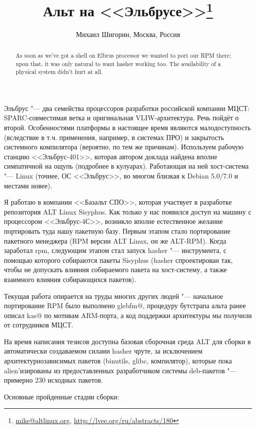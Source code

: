 \documentclass[10pt, a5paper]{article}
\begin{document}
\title{Альт на <<Эльбрусе>>\footnote{\url{mike@altlinux.org}, \url{http://lvee.org/ru/abstracts/180}}}
\author{Михаил Шигорин, Москва, Россия}
\maketitle
\begin{abstract}
As soon as we've got a shell on Elbrus processor we wanted to port our RPM there; upon that, it was only natural to want hasher working too. The availability of a physical system didn't hurt at all.
\end{abstract}
Эльбрус "--- два семейства процессоров разработки российской компании МЦСТ: SPARC-совместимая ветка и оригинальная VLIW-архитектура. Речь пойдёт о второй. Особенностями платформы в настоящее время являются малодоступность (вследствие в т.ч. применения, например, в системах ПРО) и закрытость системного компилятора (вероятно, по тем же причинам). Используем рабочую станцию <<Эльбрус-401>>, которая автором доклада найдена вполне симпатичной на ощупь (подробнее в кулуарах). Работающая на ней хост-система "--- Linux (точнее, ОС <<Эльбрус>>, во многом близкая к Debian 5.0/7.0 и местами новее).

Я работаю в компании <<Базальт СПО>>, которая участвует в разработке репозитория ALT Linux Sisyphus. Как только у нас появился доступ на машину с процессором <<Эльбрус-4С>>, возникло вполне естественное желание портировать туда нашу пакетную базу. Первым этапом стало портирование пакетного менеджера (RPM версии ALT Linux, он же ALT-RPM). Когда заработал rpm, следующим этапом стал запуск hasher "--- инструмента, с помощью которого собираются пакеты Sisyphus (hasher спроектирован так, чтобы не допускать влияния собираемого пакета на хост-систему, а также взаимного влияния собирающихся пакетов).

Текущая работа опирается на труды многих других людей "---  начальное портирование RPM было выполнено glebfm@, процедуру бутстрапа альта ранее описал kas@ по мотивам ARM-порта, а код поддержки архитектуры мы получили от сотрудников МЦСТ.

На время написания тезисов доступна базовая сборочная среда ALT для сборки в автоматически создаваемом силами hasher чруте, за исключением архитектурнозависимых пакетов (binutils, glibc, компилятор), которые пока alien'изированы из предоставленных разработчиком системы deb-пакетов "---  примерно 230 исходных пакетов.

Основные пройденные стадии сборки:
\end{document}
